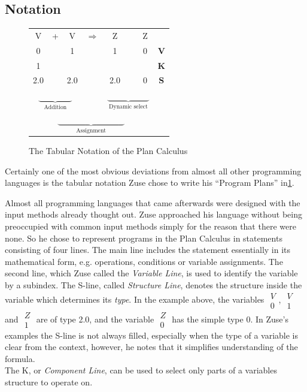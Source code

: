 \documentclass{llncs}
\begin{document}
 \subsection{Notation}
 \begin{figure}[tb]
   \begin{center}
     \begin{tabular}[bt]{c c c c c c c | c}
       V & + & V & $\Rightarrow$ & Z & {\LARGE\multirow{3}{*}{$\swarrow$}} & Z & ~\\
       0 &   & 1 &               & 1 &   & 0 & {\bf V}\\
       1 &   &   &               &   & &   & {\bf K}\\
       2.0 & & 2.0 &             & 2.0 & & 0 & {\bf S} \\
       \multicolumn{3}{c}{$\underbrace{\qquad\qquad}_{\text{Addition}}$}
       	& & \multicolumn{3}{c}{$\underbrace{\qquad\qquad\quad}_{\text{Dynamic select}}$} \\
	\multicolumn{7}{c}{$\underbrace{\qquad\qquad\qquad\qquad}_{\text{Assignment}}$} &
     \end{tabular}
   \end{center}
   \caption{The Tabular Notation of the Plan Calculus}
   \label{fig:notation}
 \end{figure}
   Certainly one of the most obvious deviations from almost all other programming 
   languages is the tabular notation Zuse chose to write his ``Program Plans'' in\ref{fig:notation}. 
   
   Almost all programming languages that came afterwards were designed with the input
   methods already thought out. Zuse approached his language without being preoccupied 
   with common input methods simply for the reason that there were none. So he chose 
   to represent programs in the Plan Calculus in statements consisting of four lines. 
   The main line includes the statement essentially in its mathematical form, 
   e.g. operations, conditions or variable assignments.
   The second line, which Zuse called the \emph{Variable Line}, is used to identify 
   the variable by a subindex. The S-line, called \emph{Structure Line}, denotes the 
   structure inside the variable which determines its \emph{type}. In the example above, the variables 
   $\begin{matrix}V\\0\end{matrix}$, $\begin{matrix}V\\1\end{matrix}$ and 
   $\begin{matrix}Z\\1\end{matrix}$ are of type 2.0, and the variable $\begin{matrix}Z\\0\end{matrix}$
   has the simple type 0. In Zuse's examples the S-line is not always filled, especially when the 
   type of a variable is clear from the context, however, he notes that it simplifies understanding 
   of the formula\cite{rojas2002plankalkuel}.\\
   The K, or \emph{Component Line}, can be used to select only parts of a variables structure to operate 
   on.
\end{document}

